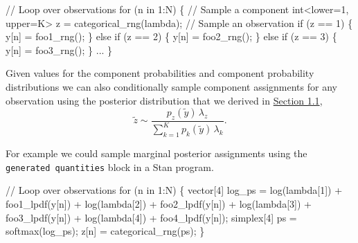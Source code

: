 \documentclass[
  letterpaper,
  DIV=11,
  numbers=noendperiod]{scrartcl}
\newenvironment{Shaded}{\begin{snugshade}}{\end{snugshade}}
\newcommand{\CommentTok}[1]{\textcolor[rgb]{0.37,0.37,0.37}{#1}}
\newcommand{\ControlFlowTok}[1]{\textcolor[rgb]{0.00,0.23,0.31}{#1}}
\newcommand{\DataTypeTok}[1]{\textcolor[rgb]{0.68,0.00,0.00}{#1}}
\newcommand{\DecValTok}[1]{\textcolor[rgb]{0.68,0.00,0.00}{#1}}
\newcommand{\KeywordTok}[1]{\textcolor[rgb]{0.00,0.23,0.31}{#1}}
\newcommand{\NormalTok}[1]{\textcolor[rgb]{0.00,0.23,0.31}{#1}}
\begin{document}
\begin{Shaded}
\begin{Highlighting}[]
\CommentTok{// Loop over observations}
\ControlFlowTok{for}\NormalTok{ (n }\ControlFlowTok{in} \DecValTok{1}\NormalTok{:N) \{}
  \CommentTok{// Sample a component}
  \DataTypeTok{int}\NormalTok{\textless{}}\KeywordTok{lower}\NormalTok{=}\DecValTok{1}\NormalTok{, }\KeywordTok{upper}\NormalTok{=K\textgreater{} z = categorical\_rng(lambda);}
  \CommentTok{// Sample an observation}
  \ControlFlowTok{if}\NormalTok{ (z == }\DecValTok{1}\NormalTok{) \{}
\NormalTok{    y[n] = foo1\_rng();}
\NormalTok{  \} }\ControlFlowTok{else} \ControlFlowTok{if}\NormalTok{ (z == }\DecValTok{2}\NormalTok{) \{}
\NormalTok{    y[n] = foo2\_rng();}
\NormalTok{  \} }\ControlFlowTok{else} \ControlFlowTok{if}\NormalTok{ (z == }\DecValTok{3}\NormalTok{) \{}
\NormalTok{    y[n] = foo3\_rng();}
\NormalTok{  \} ...}
\NormalTok{\}}
\end{Highlighting}
\end{Shaded}

Given values for the component probabilities and component probability
distributions we can also conditionally sample component assignments for
any observation using the posterior distribution that we derived in
\hyperref[sec:cat_impl]{Section 1.1}, \[
\tilde{z}
\sim
\frac{ p_{z}(\tilde{y}) \, \lambda_{z} }
{ \sum_{k = 1}^{K} p_{k}(\tilde{y}) \, \lambda_{k} }.
\]

For example we could sample marginal posterior assignments using the
\texttt{generated\ quantities} block in a Stan program.

\begin{Shaded}
\begin{Highlighting}[]
\CommentTok{// Loop over observations}
\ControlFlowTok{for}\NormalTok{ (n }\ControlFlowTok{in} \DecValTok{1}\NormalTok{:N) \{}
  \DataTypeTok{vector}\NormalTok{[}\DecValTok{4}\NormalTok{] log\_ps =   log(lambda[}\DecValTok{1}\NormalTok{]) + foo1\_lpdf(y[n])}
\NormalTok{                     + log(lambda[}\DecValTok{2}\NormalTok{]) + foo2\_lpdf(y[n])}
\NormalTok{                     + log(lambda[}\DecValTok{3}\NormalTok{]) + foo3\_lpdf(y[n])}
\NormalTok{                     + log(lambda[}\DecValTok{4}\NormalTok{]) + foo4\_lpdf(y[n]);}
  \DataTypeTok{simplex}\NormalTok{[}\DecValTok{4}\NormalTok{] ps = softmax(log\_ps);}
\NormalTok{  z[n] = categorical\_rng(ps);}
\NormalTok{\}}
\end{Highlighting}
\end{Shaded}
\end{document}
